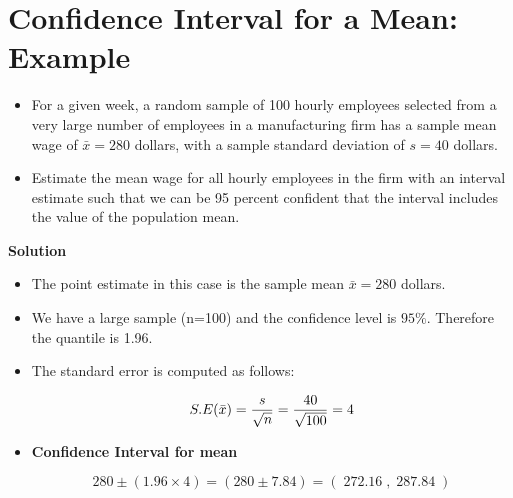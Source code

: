 \documentclass[a4paper,12pt]{article}
\begin{document}

\section*{Confidence Interval for a Mean: Example }

\begin{itemize}
\item For a given week, a random sample of 100 hourly employees selected from a very large number of
employees in a manufacturing firm has a sample mean wage of $\bar{x} = 280$ dollars, with a sample standard deviation of
$s = 40$ dollars.
\item Estimate the mean wage for all hourly employees in the firm with an interval estimate such that we can be 95
percent confident that the interval includes the value of the population mean.
\end{itemize}

\noindent \textbf{Solution}
\begin{itemize}
\item The point estimate in this case is the sample mean $\bar{x} = 280$ dollars.
\item We have a large sample (n=100) and the confidence level is $95\%$. Therefore the quantile  is 1.96.
\item The standard error is computed as follows:

\[ S.E( \bar{x} )  = {s \over \sqrt{n}}  =  {40 \over \sqrt{100}} = 4  \]
\item \textbf{Confidence Interval for mean}

\[
280 \pm (1.96 \times 4)  = (280 \pm 7.84) = (\;272.16\;,\;287.84\;)
\]

\end{itemize}
\end{document}

